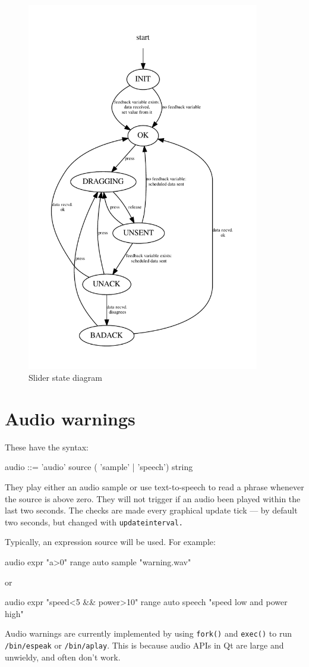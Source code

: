 \begin{figure}[ht]
\center
\includegraphics[width=4in]{stateSlider.pdf}
\caption{Slider state diagram}
\label{sliderstate}
\end{figure}

\section{Audio warnings}
These have the syntax:
\begin{v}
audio       ::= 'audio' source ( 'sample' | 'speech') string
\end{v}
They play either an audio sample or use text-to-speech to read a phrase whenever the source is above zero.
They will not trigger if an audio been played within the last two seconds. The checks are made every graphical
update tick --- by default two seconds, but changed with \texttt{updateinterval.} 

Typically, an expression source will be used. For example:
\begin{v}
    audio expr "a>0" range auto sample "warning.wav"
\end{v}
or 
\begin{v}
    audio expr "speed<5 && power>10" range auto speech "speed low and power high"
\end{v}
Audio warnings are currently implemented by using \verb+fork()+ and \verb+exec()+ 
to run \verb+/bin/espeak+ or \verb+/bin/aplay+. This is because audio APIs
in Qt are large and unwieldy, and often don't work.




